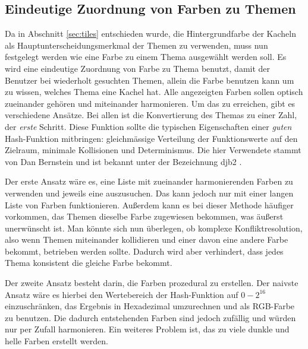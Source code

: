 \documentclass[12pt,twoside]{book}
\begin{document}
\subsection{Eindeutige Zuordnung von Farben zu Themen}


Da in Abschnitt \ref{sec:tiles} entschieden wurde, die Hintergrundfarbe der Kacheln als Hauptunterscheidungsmerkmal der Themen zu verwenden, muss nun festgelegt werden wie eine Farbe zu einem Thema ausgewählt werden soll.
Es wird eine eindeutige Zuordnung von Farbe zu Thema benutzt, damit der Benutzer bei wiederholt gesuchten Themen, allein die Farbe benutzen kann um zu wissen, welches Thema eine Kachel hat.
Alle angezeigten Farben sollen optisch zueinander gehören und miteinander harmonieren. Um das zu erreichen, gibt es verschiedene Ansätze. Bei allen ist die Konvertierung des Themas zu einer Zahl, der \textit{erste} Schritt. Diese Funktion sollte die typischen Eigenschaften einer \textit{guten} Hash-Funktion mitbringen: gleichmässige Verteilung der Funktionswerte auf den Zielraum, minimale Kollisionen und Determinismus.
Die hier Verwendete stammt von Dan Bernstein und ist bekannt unter der Bezeichnung djb2 \cite{djb2}.

Der erste Ansatz wäre es, eine Liste mit zueinander harmonierenden Farben zu verwenden und jeweils eine auszusuchen. Das kann jedoch nur mit einer langen Liste von Farben funktionieren. Außerdem kann es bei dieser Methode häufiger vorkommen, das Themen dieselbe Farbe zugewiesen bekommen, was äußerst unerwünscht ist. Man könnte sich nun überlegen, ob komplexe Konfliktresolution, also wenn Themen miteinander kollidieren und einer davon eine andere Farbe bekommt, betrieben werden sollte.
Dadurch wird aber verhindert, dass jedes Thema konsistent die gleiche Farbe bekommt.


Der zweite Ansatz besteht darin, die Farben prozedural zu erstellen.
Der naivste Ansatz wäre es hierbei den Wertebereich der Hash-Funktion auf $0 - 2^{16}$ einzuschränken, das Ergebnis in Hexadezimal umzurechnen und als RGB-Farbe zu benutzen. Die dadurch entstehenden Farben sind jedoch zufällig und würden nur per Zufall harmonieren. Ein weiteres Problem ist, das zu viele dunkle und helle Farben erstellt werden.
\end{document}
